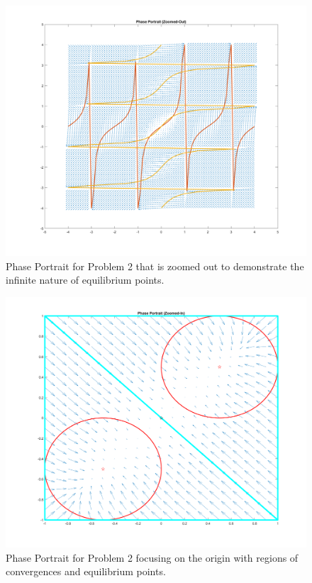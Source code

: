 \documentclass[letter]{article}
\numberwithin{equation}{section}
\begin{document}
\begin{figure}[p]
	\centering
	\includegraphics[width=\linewidth]{fig/pblm2_phaseplot_zoomOut}
	\caption{Phase Portrait for Problem 2 that is zoomed out to demonstrate the infinite nature of equilibrium points.}
	\label{fig:pblm2phaseplot_zoomOut}
\end{figure}


\begin{figure}[p]
	\centering
	\includegraphics[width=\linewidth]{fig/pblm2_phaseplot_origin}
	\caption{Phase Portrait for Problem 2 focusing on the origin with regions of convergences and equilibrium points.}
	\label{fig:pblm2phaseplot_origin}
\end{figure}
\end{document}
